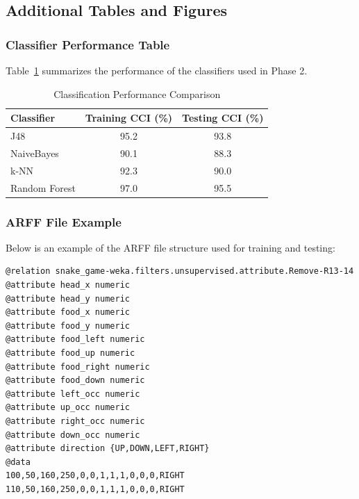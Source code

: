 \documentclass[12pt,a4paper]{article}
\begin{document}
\subsection{Additional Tables and Figures}

\subsubsection{Classifier Performance Table}
Table~\ref{tab:results} summarizes the performance of the classifiers used in Phase 2.

\begin{table}[ht]
\centering
\caption{Classification Performance Comparison}
\label{tab:results}
\begin{tabular}{lcc}
\hline
\textbf{Classifier} & \textbf{Training CCI (\%)} & \textbf{Testing CCI (\%)} \\ \hline
J48               & 95.2                       & 93.8                     \\
NaiveBayes        & 90.1                       & 88.3                     \\
k-NN              & 92.3                       & 90.0                     \\
Random Forest     & 97.0                       & 95.5                     \\ \hline
\end{tabular}
\end{table}

\subsubsection{ARFF File Example}
Below is an example of the ARFF file structure used for training and testing:

\begin{verbatim}
@relation snake_game-weka.filters.unsupervised.attribute.Remove-R13-14
@attribute head_x numeric
@attribute head_y numeric
@attribute food_x numeric
@attribute food_y numeric
@attribute food_left numeric
@attribute food_up numeric
@attribute food_right numeric
@attribute food_down numeric
@attribute left_occ numeric
@attribute up_occ numeric
@attribute right_occ numeric
@attribute down_occ numeric
@attribute direction {UP,DOWN,LEFT,RIGHT}
@data
100,50,160,250,0,0,1,1,1,0,0,0,RIGHT
110,50,160,250,0,0,1,1,1,0,0,0,RIGHT
\end{verbatim}
\end{document}
